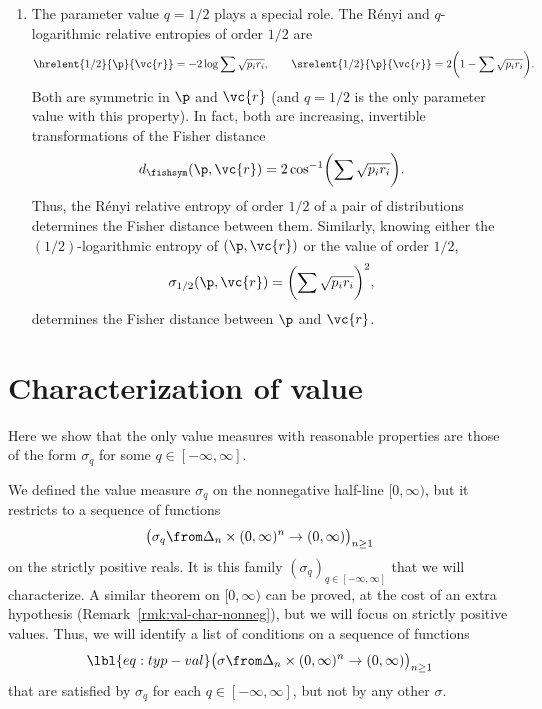 \begin{remarks}
\begin{enumerate}
\item
The parameter value $q = 1/2$ plays a special role.  The R\'enyi%
%
% 
and $q$-logarithmic%
%
% 
relative entropies of order $1/2$ are
\[
\hrelent{1/2}{\p}{\vc{r}} = -2 \log \sum \sqrt{p_i r_i},
\qquad
\srelent{1/2}{\p}{\vc{r}} = 2 \biggl( 1 - \sum \sqrt{p_i r_i} \biggr).
\]
Both are symmetric in $\p$ and $\vc{r}$ (and $q = 1/2$ is the only
parameter value with this property).  In fact, both are
increasing, invertible transformations of the Fisher%
%
% 
distance
\[
d_\fishsym(\p, \vc{r}) 
= 
2 \cos^{-1} \biggl( \sum \sqrt{p_i r_i} \biggr).
\]
Thus, the R\'enyi relative entropy of order $1/2$ of a pair of
distributions determines the Fisher distance between them.  Similarly,
knowing either the $(1/2)$-logarithmic entropy of $(\p, \vc{r})$ or the
value of order $1/2$,
\[
\sigma_{1/2}(\p, \vc{r}) = \biggl( \sum \sqrt{p_i r_i} \biggr)^2,
\]
determines the Fisher distance between $\p$ and $\vc{r}$.
\end{enumerate}
\end{remarks}


\section{Characterization of value}

 
Here we show that the only value measures with reasonable properties are
those of the form $\sigma_q$ for some $q \in [-\infty, \infty]$.  

We defined the value measure $\sigma_q$ on the nonnegative half-line $[0,
  \infty)$, but it restricts to a sequence of functions
\[
\bigl( 
\sigma_q \from \Delta_n \times (0, \infty)^n \to (0, \infty) 
\bigr)_{n \geq 1}
\]
on the strictly positive reals. It is this family $(\sigma_q)_{q \in
  [-\infty, \infty]}$ that we will characterize.  A similar theorem on $[0,
  \infty)$ can be proved, at the cost of an extra hypothesis
  (Remark~\ref{rmk:val-char-nonneg}), but we will focus on strictly
  positive values.
% 
Thus, we will identify a list of conditions on a sequence of functions
% 
\begin{equation}
\lbl{eq:typ-val}
\bigl( 
\sigma \from \Delta_n \times (0, \infty)^n \to (0, \infty) 
\bigr)_{n \geq 1}
\end{equation}
% 
that are satisfied by $\sigma_q$ for each $q \in [-\infty, \infty]$, but
not by any other $\sigma$.

